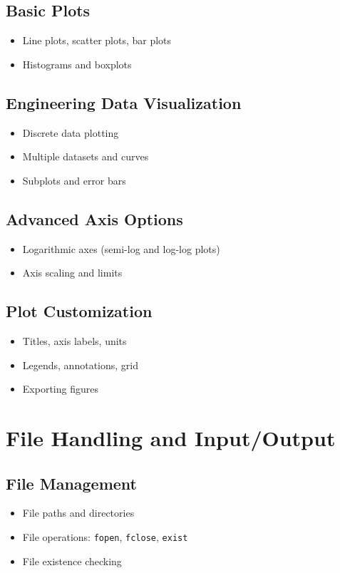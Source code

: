 \documentclass[11pt, a4paper]{article}
\begin{document}
\subsection{Basic Plots}
\begin{itemize}
  \item Line plots, scatter plots, bar plots
  \item Histograms and boxplots
\end{itemize}

\subsection{Engineering Data Visualization}
\begin{itemize}
  \item Discrete data plotting
  \item Multiple datasets and curves
  \item Subplots and error bars
\end{itemize}

\subsection{Advanced Axis Options}
\begin{itemize}
  \item Logarithmic axes (semi-log and log-log plots)
  \item Axis scaling and limits
\end{itemize}

\subsection{Plot Customization}
\begin{itemize}
  \item Titles, axis labels, units
  \item Legends, annotations, grid
  \item Exporting figures
\end{itemize}

\section{File Handling and Input/Output}

\subsection{File Management}
\begin{itemize}
  \item File paths and directories
  \item File operations: \texttt{fopen}, \texttt{fclose}, \texttt{exist}
  \item File existence checking
\end{itemize}
\end{document}
